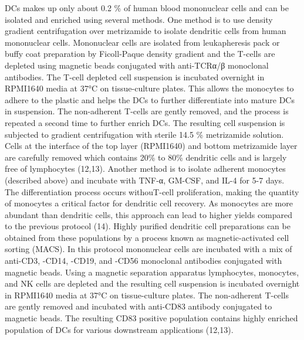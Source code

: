 \documentclass[
]{article}
\begin{document}
DCs makes up only about 0.2 \% of human blood mononuclear cells and can
be isolated and enriched using several methods. One method is to use
density gradient centrifugation over metrizamide to isolate dendritic
cells from human mononuclear cells. Mononuclear cells are isolated from
leukapheresis pack or buffy coat preparation by Ficoll-Paque density
gradient and the T-cells are depleted using magnetic beads conjugated
with anti-TCRα/β monoclonal antibodies. The T-cell depleted cell
suspension is incubated overnight in RPMI1640 media at 37°C on
tissue-culture plates. This allows the monocytes to adhere to the
plastic and helps the DCs to further differentiate into mature DCs in
suspension. The non-adherent T-cells are gently removed, and the process
is repeated a second time to further enrich DCs. The resulting cell
suspension is subjected to gradient centrifugation with sterile 14.5 \%
metrizamide solution. Cells at the interface of the top layer (RPMI1640)
and bottom metrizamide layer are carefully removed which contains 20\%
to 80\% dendritic cells and is largely free of lymphocytes (12,13).
Another method is to isolate adherent monocytes (described above) and
incubate with TNF-α, GM-CSF, and IL-4 for 5-7 days. The differentiation
process occurs withouT-cell proliferation, making the quantity of
monocytes a critical factor for dendritic cell recovery. As monocytes
are more abundant than dendritic cells, this approach can lead to higher
yields compared to the previous protocol (14). Highly purified dendritic
cell preparations can be obtained from these populations by a process
known as magnetic-activated cell sorting (MACS). In this protocol
mononuclear cells are incubated with a mix of anti-CD3, -CD14, -CD19,
and -CD56 monoclonal antibodies conjugated with magnetic beads. Using a
magnetic separation apparatus lymphocytes, monocytes, and NK cells are
depleted and the resulting cell suspension is incubated overnight in
RPMI1640 media at 37°C on tissue-culture plates. The non-adherent
T-cells are gently removed and incubated with anti-CD83 antibody
conjugated to magnetic beads. The resulting CD83 positive population
contains highly enriched population of DCs for various downstream
applications (12,13).
\end{document}
